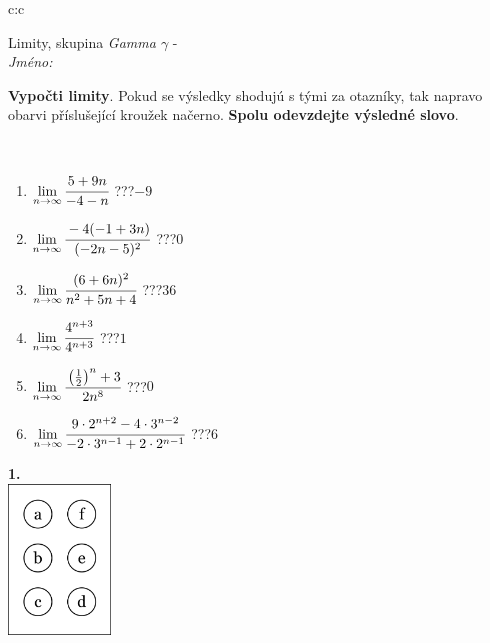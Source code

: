 \documentclass[10pt]{report}
\begin{document}
\begin{tabular}{c:c}
\begin{minipage}[c][104.5mm][t]{0.5\linewidth}
\begin{center}
\vspace{7mm}
{\huge Limity, skupina \textit{Gamma $\gamma$} -}\\[5mm]
\textit{Jméno:}\phantom{xxxxxxxxxxxxxxxxxxxxxxxxxxxxxxxxxxxxxxxxxxxxxxxxxxxxxxxxxxxxxxxxx}\\[5mm]
\begin{minipage}{0.95\linewidth}
\begin{center}
\textbf{Vypočti limity}. Pokud se výsledky shodujú s tými za otazníky, tak napravo\\obarvi příslušející kroužek načerno. \textbf{Spolu odevzdejte výsledné slovo}.
\end{center}
\end{minipage}
\\[1mm]
\begin{minipage}{0.79\linewidth}
\begin{center}
\begin{varwidth}{\linewidth}
\begin{enumerate}
\normalsize
\item $\lim\limits_{n\to\infty}\cfrac{5+9n}{-4-n}$\quad \dotfill\; ???\;\dotfill \quad $-9$
\item $\lim\limits_{n\to\infty}\cfrac{-4(-1+3n)}{(-2n-5)^2}$\quad \dotfill\; ???\;\dotfill \quad $0$
\item $\lim\limits_{n\to\infty}\cfrac{(6+6n)^2}{n^2+5n+4}$\quad \dotfill\; ???\;\dotfill \quad $36$
\item $\lim\limits_{n\to\infty}\cfrac{4^{n+3}}{4^{n+3}}$\quad \dotfill\; ???\;\dotfill \quad $1$
\item $\lim\limits_{n\to\infty}\cfrac{\left(\frac{1}{2}\right)^n +3}{2n^{8}}$\quad \dotfill\; ???\;\dotfill \quad $0$
\item $\lim\limits_{n\to\infty}\cfrac{9\cdot 2^{n+2}-4\cdot 3^{n-2}}{-2\cdot 3^{n-1}+2\cdot 2^{n-1}}$\quad \dotfill\; ???\;\dotfill \quad $6$
\end{enumerate}
\end{varwidth}
\end{center}
\end{minipage}
\begin{minipage}{0.20\linewidth}
\begin{center}
{\Huge\bfseries 1.} \\[2mm]
\includegraphics[height=40mm]{../images/braille.png}

\end{center}
\end{minipage}
\end{center}
\end{minipage}
\end{tabular}
\end{document}
